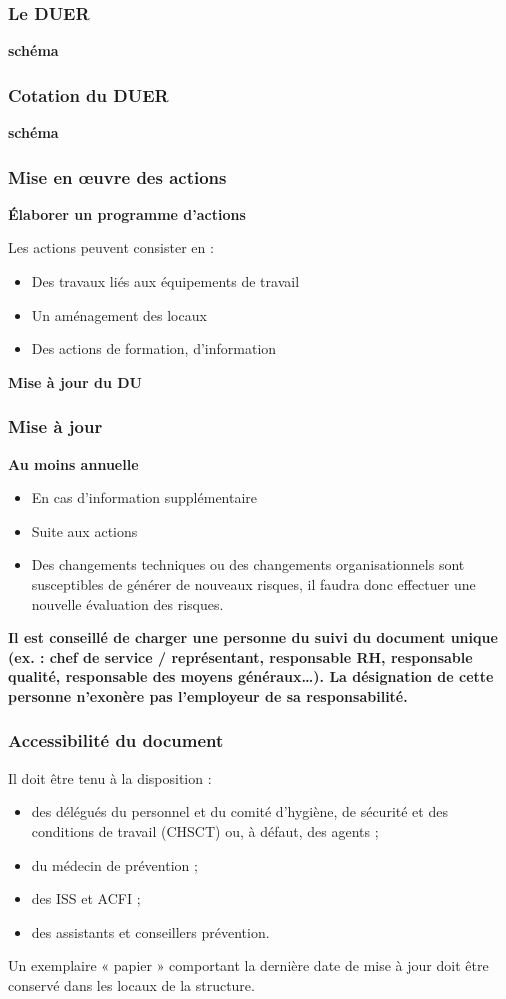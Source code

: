 \documentclass{beamer}
\begin{document}
\begin{frame}
\frametitle{Le DUER}

\textbf{schéma}
\end{frame}

\begin{frame}
\frametitle{Cotation du DUER}

\textbf{schéma}
\end{frame}

\begin{frame}
\frametitle{Mise en œuvre des actions}

\textbf{Élaborer un programme d’actions }

Les actions peuvent consister en :
\begin{itemize}
\item Des travaux liés aux équipements de travail
\item Un aménagement des locaux
\item Des actions de formation, d’information
\end{itemize}
\textbf{Mise à jour du DU}
\end{frame}


\begin{frame}
\frametitle{Mise à jour}

\textbf{Au moins annuelle}
\begin{itemize}
\item En cas d’information supplémentaire
\item Suite aux actions 
\item Des changements techniques ou des changements organisationnels sont susceptibles de générer de nouveaux risques, il faudra donc effectuer une nouvelle évaluation des risques.
\end{itemize}
\textbf{Il est conseillé de charger une personne du suivi du document unique (ex. : chef de service / représentant, responsable RH, responsable qualité, responsable des moyens généraux…).
La désignation de cette personne n’exonère pas l’employeur de sa responsabilité.}
\end{frame}

\begin{frame}
\frametitle{Accessibilité du document}

Il doit être tenu à la disposition :
\begin{itemize}
\item des délégués du personnel et du comité d’hygiène, de sécurité et des conditions de travail (CHSCT) ou, à défaut, des agents ;
\item du médecin de prévention ;
\item des ISS et ACFI ;
\item des assistants et conseillers prévention.
\end{itemize}

Un exemplaire « papier » comportant la dernière date de mise à jour doit être conservé dans les locaux de la structure.
\end{frame}
\end{document}
